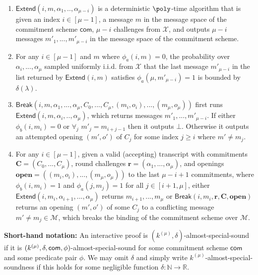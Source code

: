 \begin{definition}
\begin{enumerate}
\item  $\textsf{Extend}(i, m, \alpha_1,..,\alpha_{\mu-i})$ is a deterministic $\poly$-time algorithm that is given an index $i \in [\mu-1]$, a message $m$ in the message space of the commitment scheme $\textsf{com}$, $\mu-i$ challenges from $\mathcal{X}$, and outputs $\mu-i$ messages $m'_1,...,m'_{\mu-i}$ in the message space of the commitment scheme. 
\item For any $i \in [\mu-1]$ and $m$ where $\phi_a(i,m) = 0$, the probability over $\alpha_i,...,\alpha_\mu$ sampled uniformly i.i.d. from $\mathcal{X}$ that the last message $m'_{\mu-i}$ in the list returned by $\textsf{Extend}(i, m)$ satisfies $\phi_a(\mu, m'_{\mu-i}) = 1$ is bounded by $\delta(\lambda)$.   

\item $\textsf{Break}(i, m, \alpha_1,...,\alpha_\mu, C_0,...,C_\mu, (m_i, o_i),...,(m_{\mu}, o_{\mu}))$ first runs $\textsf{Extend}(i, m, \alpha_i,..,\alpha_{\mu})$, which returns messages $m'_1,...,m'_{\mu-i}$. If  either $\phi_b(i, m_i) = 0$ or $\forall_j$ $m'_j = m_{i + j -1}$ then it outputs $\bot$. Otherwise it outputs an attempted opening $(m', o')$ of $C_j$ for some index $j \geq i$ where $m' \neq m_j$. %



\item For any $i \in [\mu-1]$, given a valid (accepting) transcript with commitments $\mathbf{C} = (C_0,...,C_\mu)$, round challenges $\mathbf{r} = (\alpha_1,...,\alpha_{\mu})$, and openings $\mathbf{open} = ((m_{i},o_{i}),...,(m_\mu, o_\mu))$ to the last $\mu-i+1$ commitments, where $\phi_b(i, m_i) = 1$ and $\phi_a(j, m_j) = 1$ for all $j \in [i+1,\mu]$, either $\textsf{Extend}(i, m_i, \alpha_{i+1},...,\alpha_\mu)$ returns $m_{i+1},...,m_{\mu}$ or $\textsf{Break}(i, m_i, \mathbf{r}, \mathbf{C}, \mathbf{open})$ returns an opening $(m', o')$ of some $C_j$ to a conflicting message $m' \neq m_j \in \mathcal{M}$, which breaks the binding of the commitment scheme over $\mathcal{M}$.
\end{enumerate} 

\textbf{Short-hand notation:} An interactive proof is $(k^{(\mu)}, \delta)$-almost-special-sound if it is $(k^{(\mu)}, \delta, \mathsf{com}, \phi)$-almost-special-sound for some commitment scheme $\textsf{com}$ and some predicate pair $\phi$. We may omit $\delta$ and simply write $k^{(\mu)}$-almost-special-soundness if this holds for some negligible function $\delta: \mathbb{N} \rightarrow \mathbb{R}$. 
\end{definition} 

